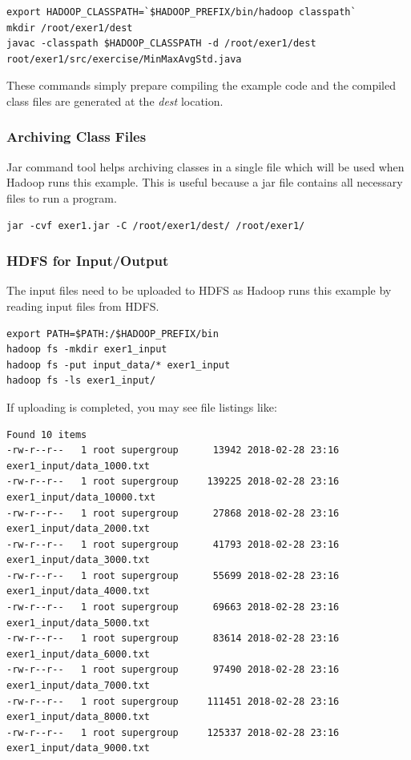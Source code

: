 \begin{lstlisting}
export HADOOP_CLASSPATH=`$HADOOP_PREFIX/bin/hadoop classpath`
mkdir /root/exer1/dest
javac -classpath $HADOOP_CLASSPATH -d /root/exer1/dest root/exer1/src/exercise/MinMaxAvgStd.java
\end{lstlisting}

These commands simply prepare compiling the example code and the compiled class
files are generated at the \textit{dest} location.

\subsubsection{Archiving Class Files}

Jar command tool helps archiving classes in a single file which will be used
when Hadoop runs this example. This is useful because a jar file contains all
necessary files to run a program.

\begin{lstlisting}
jar -cvf exer1.jar -C /root/exer1/dest/ /root/exer1/
\end{lstlisting}

\subsubsection{HDFS for Input/Output}

The input files need to be uploaded to HDFS as Hadoop runs this example by
reading input files from HDFS.

\begin{lstlisting}
export PATH=$PATH:/$HADOOP_PREFIX/bin
hadoop fs -mkdir exer1_input
hadoop fs -put input_data/* exer1_input
hadoop fs -ls exer1_input/
\end{lstlisting}

If uploading is completed, you may see file listings like:

\begin{lstlisting}
Found 10 items
-rw-r--r--   1 root supergroup      13942 2018-02-28 23:16 exer1_input/data_1000.txt
-rw-r--r--   1 root supergroup     139225 2018-02-28 23:16 exer1_input/data_10000.txt
-rw-r--r--   1 root supergroup      27868 2018-02-28 23:16 exer1_input/data_2000.txt
-rw-r--r--   1 root supergroup      41793 2018-02-28 23:16 exer1_input/data_3000.txt
-rw-r--r--   1 root supergroup      55699 2018-02-28 23:16 exer1_input/data_4000.txt
-rw-r--r--   1 root supergroup      69663 2018-02-28 23:16 exer1_input/data_5000.txt
-rw-r--r--   1 root supergroup      83614 2018-02-28 23:16 exer1_input/data_6000.txt
-rw-r--r--   1 root supergroup      97490 2018-02-28 23:16 exer1_input/data_7000.txt
-rw-r--r--   1 root supergroup     111451 2018-02-28 23:16 exer1_input/data_8000.txt
-rw-r--r--   1 root supergroup     125337 2018-02-28 23:16 exer1_input/data_9000.txt
\end{lstlisting}

